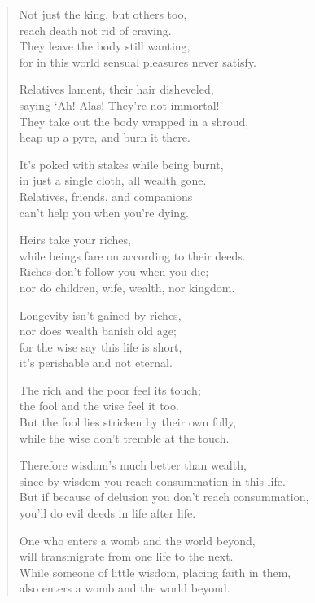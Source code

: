 \documentclass[12pt,openany]{book}%
\begin{document}
\begin{verse}
Not just the king, but others too, \\
reach death not rid of craving. \\
They leave the body still wanting, \\
for in this world sensual pleasures never satisfy. 

Relatives lament, their hair disheveled, \\
saying ‘Ah! Alas! They’re not immortal!’ \\
They take out the body wrapped in a shroud, \\
heap up a pyre, and burn it there. 

It’s poked with stakes while being burnt, \\
in just a single cloth, all wealth gone. \\
Relatives, friends, and companions \\
can’t help you when you’re dying. 

Heirs take your riches, \\
while beings fare on according to their deeds. \\
Riches don’t follow you when you die; \\
nor do children, wife, wealth, nor kingdom. 

Longevity isn’t gained by riches, \\
nor does wealth banish old age; \\
for the wise say this life is short, \\
it’s perishable and not eternal. 

The rich and the poor feel its touch; \\
the fool and the wise feel it too. \\
But the fool lies stricken by their own folly, \\
while the wise don’t tremble at the touch. 

Therefore wisdom’s much better than wealth, \\
since by wisdom you reach consummation in this life. \\
But if because of delusion you don’t reach consummation, \\
you’ll do evil deeds in life after life. 

One who enters a womb and the world beyond, \\
will transmigrate from one life to the next. \\
While someone of little wisdom, placing faith in them, \\
also enters a womb and the world beyond. 


\end{verse}
\end{document}

